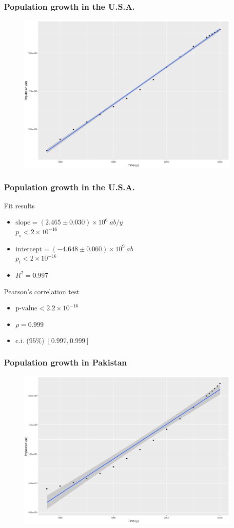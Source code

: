 \documentclass[
	11pt, %
]{beamer}
\begin{document}
\begin{frame}
	\frametitle{Population growth in the U.S.A.}
	\begin{figure}
		\includegraphics[width=.69\textwidth]{usa.png}
	\end{figure}
\end{frame}

\begin{frame}
	\frametitle{Population growth in the U.S.A.}
	\begin{exampleblock}{Fit results}
		\begin{itemize}
			\item $\text{slope} = \left(2.465 \pm 0.030\right) \times 10^6 \ ab/y$ \\
				$p_s < 2 \times 10^{-16}$
			\item $\text{intercept} = \left(-4.648 \pm 0.060\right) \times 10^9 \ ab$ \\
				$p_i < 2 \times 10^{-16}$
			\item $R^2 = 0.997$
		\end{itemize}
	\end{exampleblock}
	\begin{block}{Pearson's correlation test}
		\begin{itemize}
			\item $\text{p-value} < 2.2 \times 10^{-16}$
			\item $\rho = 0.999$
			\item c.i. ($95\%$) $\left[0.997, 0.999\right]$
		\end{itemize}
	\end{block}
\end{frame}

\begin{frame}
	\frametitle{Population growth in Pakistan}
	\begin{figure}
		\includegraphics[width=.69\textwidth]{pak.png}
	\end{figure}
\end{frame}
\end{document}
